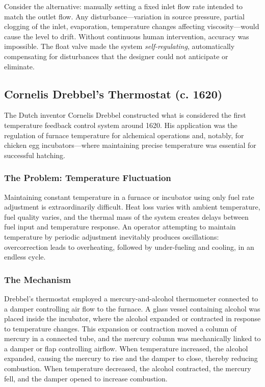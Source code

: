 Consider the alternative: manually setting a fixed inlet flow rate intended to match the outlet flow. Any disturbance---variation in source pressure, partial clogging of the inlet, evaporation, temperature changes affecting viscosity---would cause the level to drift. Without continuous human intervention, accuracy was impossible. The float valve made the system \textit{self-regulating}, automatically compensating for disturbances that the designer could not anticipate or eliminate.

\subsection{Cornelis Drebbel's Thermostat (c. 1620)}
\label{subsec:drebbel}

The Dutch inventor Cornelis Drebbel constructed what is considered the first temperature feedback control system around 1620. His application was the regulation of furnace temperature for alchemical operations and, notably, for chicken egg incubators---where maintaining precise temperature was essential for successful hatching.

\subsubsection{The Problem: Temperature Fluctuation}

Maintaining constant temperature in a furnace or incubator using only fuel rate adjustment is extraordinarily difficult. Heat loss varies with ambient temperature, fuel quality varies, and the thermal mass of the system creates delays between fuel input and temperature response. An operator attempting to maintain temperature by periodic adjustment inevitably produces oscillations: overcorrection leads to overheating, followed by under-fueling and cooling, in an endless cycle.

\subsubsection{The Mechanism}

Drebbel's thermostat employed a mercury-and-alcohol thermometer connected to a damper controlling air flow to the furnace. A glass vessel containing alcohol was placed inside the incubator, where the alcohol expanded or contracted in response to temperature changes. This expansion or contraction moved a column of mercury in a connected tube, and the mercury column was mechanically linked to a damper or flap controlling airflow. When temperature increased, the alcohol expanded, causing the mercury to rise and the damper to close, thereby reducing combustion. When temperature decreased, the alcohol contracted, the mercury fell, and the damper opened to increase combustion.

